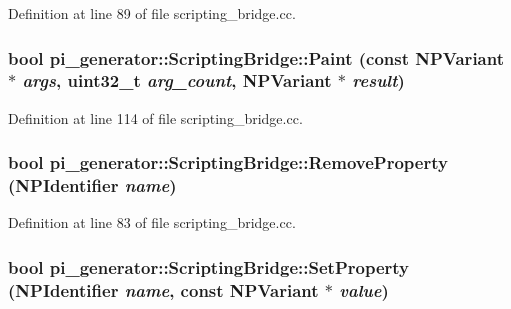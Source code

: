 Definition at line 89 of file scripting\_\-bridge.cc.

\hypertarget{classpi__generator_1_1_scripting_bridge_afcd2c9c3e990cae2d713e8bb5d84048d}{
\subsubsection[{Paint}]{\setlength{\rightskip}{0pt plus 5cm}bool pi\_\-generator::ScriptingBridge::Paint (const {\bf NPVariant} $\ast$ {\em args}, \/  uint32\_\-t {\em arg\_\-count}, \/  {\bf NPVariant} $\ast$ {\em result})}}
\label{classpi__generator_1_1_scripting_bridge_afcd2c9c3e990cae2d713e8bb5d84048d}


Definition at line 114 of file scripting\_\-bridge.cc.

\hypertarget{classpi__generator_1_1_scripting_bridge_ab1a46993e1a36b9857d48776f7085aa2}{
\subsubsection[{RemoveProperty}]{\setlength{\rightskip}{0pt plus 5cm}bool pi\_\-generator::ScriptingBridge::RemoveProperty ({\bf NPIdentifier} {\em name})}}
\label{classpi__generator_1_1_scripting_bridge_ab1a46993e1a36b9857d48776f7085aa2}


Definition at line 83 of file scripting\_\-bridge.cc.

\hypertarget{classpi__generator_1_1_scripting_bridge_aa87ffdeb58a36a1e352814132d4a020a}{
\subsubsection[{SetProperty}]{\setlength{\rightskip}{0pt plus 5cm}bool pi\_\-generator::ScriptingBridge::SetProperty ({\bf NPIdentifier} {\em name}, \/  const {\bf NPVariant} $\ast$ {\em value})}}
\label{classpi__generator_1_1_scripting_bridge_aa87ffdeb58a36a1e352814132d4a020a}


